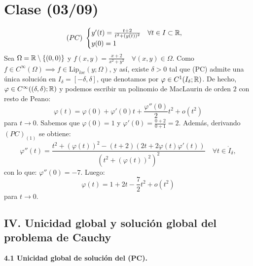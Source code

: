 \section{Clase (03/09)}

\begin{eg}[N°2]
	\[ (PC) \ \begin{cases}
		y'(t) = \frac{t+2}{t^2+(y(t))^2} \quad \forall t \in I \subset \mathbb{R}, \\
		y(0) = 1
	\end{cases} \]
	Sea $\Omega = \mathbb{R} \setminus \{(0,0)\}$ y $f(x,y) = \frac{x+2}{x^2 + y^2} \quad \forall (x,y) \in \Omega$. Como $f \in C^{\infty}(\Omega) \implies f \in \text{Lip}_{loc}(y;\Omega)$, y así, existe $\delta > 0$ tal que (PC) admite una única solución en $I_{\delta} = [-\delta,\delta]$, que denotamos por $\varphi \in C^{1}(I_{\delta};\mathbb{R})$. De hecho, $\varphi \in C^{\infty}((\delta,\delta);\mathbb{R})$ y podemos escribir un polinomio de MacLaurin de orden $2$ con resto de Peano:
	\[ \varphi(t) = \varphi(0) + \varphi'(0)t + \frac{\varphi''(0)}{2}t^2 + o(t^2) \]
	para $t \to 0$. Sabemos que $\varphi(0) = 1$ y $\varphi'(0) = \frac{0+2}{0+1}=2$. Además, derivando $(PC)_{(1)}$ se obtiene:
	\[ \varphi''(t) = \frac{t^2 + (\varphi(t))^2 - (t+2)(2t+2\varphi(t)\varphi'(t))}{(t^2 + (\varphi(t))^2)^2} \quad \forall t \in \mathring{I}_{\delta}, \]
	con lo que: $\varphi''(0) = -7$. Luego:
	\[ \varphi(t) = 1 + 2t - \frac{7}{2}t^2 + o(t^2) \]
	para $t \to 0$.
\end{eg}

\subsection*{IV. Unicidad global y solución global del problema de Cauchy}

\textbf{4.1 Unicidad global de solución del (PC).}

